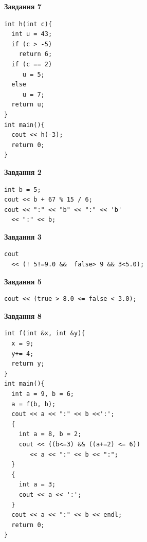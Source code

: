 \documentclass[12pt, ukrainian]{article}
\begin{document}
{\begin {large}
\begin{minipage}[t]{7.0cm}
\begin{center}
\textbf{Завдання 7}
\end{center}
\vspace{-8mm}

\begin{verbatim}
int h(int c){
  int u = 43;
  if (c > -5)
    return 6;
  if (c == 2)
     u = 5;
  else
     u = 7;
  return u;
}
int main(){
  cout << h(-3);
  return 0;
}
\end{verbatim}

\end{minipage}
\vline \hspace{1mm}
\begin{minipage}[t]{11.0cm}

\begin{center}
\textbf{Завдання 2}
\end{center}
\vspace{-8mm}

\begin{verbatim}
int b = 5;
cout << b + 67 % 15 / 6;
cout << ":" << "b" << ":" << 'b' 
  << ":" << b;
\end{verbatim}



\begin{center}
\textbf{Завдання 3}
\end{center}
\vspace{-8mm}

\begin{verbatim}
cout 
  << (! 5!=9.0 &&  false> 9 && 3<5.0);
\end{verbatim}



\begin{center}
\textbf{Завдання 5}
\end{center}
\vspace{-8mm}

\begin{verbatim}
cout << (true > 8.0 <= false < 3.0);
\end{verbatim}



\begin{center}
\textbf{Завдання 8}
\end{center}
\vspace{-8mm}

\begin{verbatim}
int f(int &x, int &y){
  x = 9;
  y+= 4;
  return y;
}
int main(){
  int a = 9, b = 6;
  a = f(b, b);
  cout << a << ":" << b <<':';
  {
    int a = 8, b = 2;
    cout << ((b<=3) && ((a+=2) <= 6))
       << a << ":" << b << ":";
  }
  {
    int a = 3;
    cout << a << ':';
  }
  cout << a << ":" << b << endl;
  return 0;
}
\end{verbatim}


\end{minipage}
\end{large}}
\end{document}
